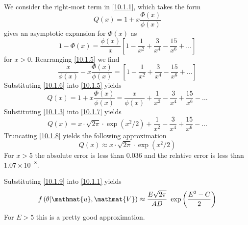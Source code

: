 \documentclass[12pt]{report}
\newcommand{\mat}[1]{\mathmat{#1}}
\begin{document}
We consider the right-most term in \eqref{10.1.1}, which takes the form
%
\begin{equation}\label{10.1.4}
    Q(x) = 1 + x \frac{\Phi(x)}{\phi(x)}
\end{equation}
%
\citet[(26.2.12)]{Abramowitz65} gives an asymptotic expansion for $\Phi(x)$ as
%
\begin{equation}\label{10.1.5}
    1 - \Phi(x) = \frac{\phi(x)}{x} \left[ 1 - \frac{1}{x^2} + \frac{3}{x^4} - \frac{15}{x^6} + \ldots \right]
\end{equation}
%
for $x > 0$. Rearranging \eqref{10.1.5} we find
%
\begin{equation}\label{10.1.6}
     \frac{x}{\phi(x)} - x \frac{\Phi(x)}{\phi(x)} = \left[ 1 - \frac{1}{x^2} + \frac{3}{x^4} - \frac{15}{x^6} + \ldots \right]
\end{equation}
%
Substituting \eqref{10.1.6} into \eqref{10.1.5} yields
%
\begin{equation}\label{10.1.7}
     Q(x) = 1 + x \frac{\Phi(x)}{\phi(x)} = \frac{x}{\phi(x)} + \frac{1}{x^2} - \frac{3}{x^4} + \frac{15}{x^6} - \ldots
\end{equation}
%
Substituting \eqref{10.1.3} into \eqref{10.1.7} yields
%
\begin{equation}\label{10.1.8}
     Q(x) = x \cdot \sqrt{2\pi} \cdot \exp{(x^2/2)} + \frac{1}{x^2} - \frac{3}{x^4} + \frac{15}{x^6} - \ldots
\end{equation}
%
Truncating \eqref{10.1.8} yields the following approximation
%
\begin{equation}\label{10.1.9}
     Q(x) \approx x \cdot \sqrt{2\pi} \cdot \exp{(x^2/2)}
\end{equation}
%
For $x > 5$ the absolute error is less than $0.036$ and the relative error is less than $1.07 \times 10^{-8}$.

Substituting \eqref{10.1.9} into \eqref{10.1.1} yields
%
\begin{equation}\label{10.1.10}
    f\left( \theta | \mat{u}, \mat{V} \right)
    \approx \frac{E\sqrt{2\pi}}{AD} ~ \exp{\left(\frac{E^2 - C}{2}\right)}
\end{equation}
%
For $E > 5$ this is a pretty good approximation.



\end{document}
